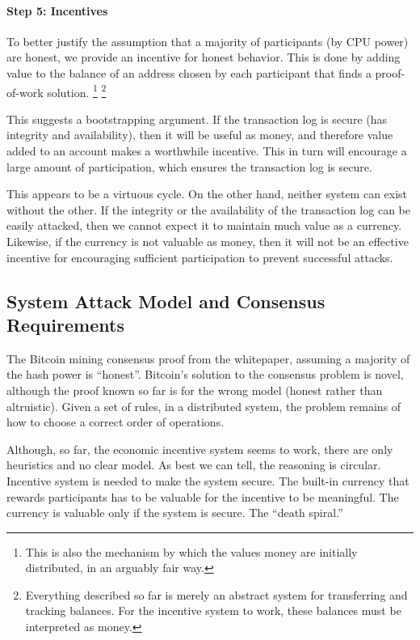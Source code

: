 \paragraph{Step 5: Incentives}

To better justify the assumption that a majority of participants (by CPU power) are honest, we provide an incentive for honest behavior. This is done by adding value to the balance of an address chosen by each participant that finds a proof-of-work solution. \footnote{This is also the mechanism by which the values money are initially distributed, in an arguably fair way.} \footnote{Everything described so far is merely an abstract system for transferring and tracking balances. For the incentive system to work, these balances must be interpreted as money.}

This suggests a bootstrapping argument. If the transaction log is secure (has integrity and availability), then it will be useful as money, and therefore value added to an account makes a worthwhile incentive. This in turn will encourage a large amount of participation, which ensures the transaction log is secure.

This appears to be a virtuous cycle. On the other hand, neither system can exist without the other. If the integrity or the availability of the transaction log can be easily attacked, then we cannot expect it to maintain much value as a currency. Likewise, if the currency is not valuable as money, then it will not be an effective incentive for encouraging sufficient participation to prevent successful attacks.


\subsection{System Attack Model and Consensus Requirements}

The Bitcoin mining consensus proof from the whitepaper, assuming a majority of the hash power is ``honest''. Bitcoin's solution to the consensus problem is novel, although the proof known so far is for the wrong model (honest rather than altruistic). Given a set of rules, in a distributed system, the problem remains of how to choose a correct order of operations.

Although, so far, the economic incentive system seems to work, there are only heuristics and no clear model. As best we can tell, the reasoning is circular. Incentive system is needed to make the system secure. The built-in currency that rewards participants has to be valuable for the incentive to be meaningful. The currency is valuable only if the system is secure. The ``death spiral.''



